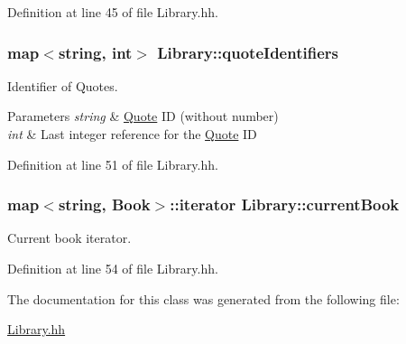 Definition at line 45 of file Library.\+hh.

\subsubsection[{\texorpdfstring{quote\+Identifiers}{quoteIdentifiers}}]{\setlength{\rightskip}{0pt plus 5cm}map$<$string, int$>$ Library\+::quote\+Identifiers\hspace{0.3cm}{\ttfamily [private]}}\hypertarget{class_library_a58c1f12a0278872cd0299e586551bb7a}{}\label{class_library_a58c1f12a0278872cd0299e586551bb7a}


Identifier of Quotes. 


\begin{DoxyParams}{Parameters}
{\em string} & \hyperlink{class_quote}{Quote} ID (without number) \\
\hline
{\em int} & Last integer reference for the \hyperlink{class_quote}{Quote} ID \\
\hline
\end{DoxyParams}


Definition at line 51 of file Library.\+hh.

\subsubsection[{\texorpdfstring{current\+Book}{currentBook}}]{\setlength{\rightskip}{0pt plus 5cm}map$<$string, {\bf Book}$>$\+::iterator Library\+::current\+Book\hspace{0.3cm}{\ttfamily [private]}}\hypertarget{class_library_a78a4071e8d610da671b3886c71900dae}{}\label{class_library_a78a4071e8d610da671b3886c71900dae}


Current book iterator. 



Definition at line 54 of file Library.\+hh.



The documentation for this class was generated from the following file\+:\begin{DoxyCompactItemize}
\item 
\hyperlink{_library_8hh}{Library.\+hh}\end{DoxyCompactItemize}
